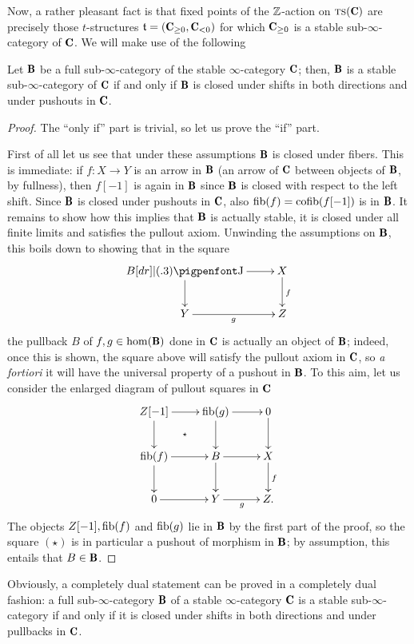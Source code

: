 \documentclass[a4paper,12pt]{amsart}
\begin{document}
Now, a rather pleasant fact is that fixed points of the $\mathbb{Z}$-action on $\ts(\C)$ are precisely those $t$-structures $\tee=(\C_{\ge 0}, \C_{<0})$ for which $\C_{\ge 0}$ is a stable sub-$\infty$-category of $\C$. We will make use of the following
\begin{lemma}\label{magicstable}
Let $\cate{B}$ be a full sub-$\infty$-category of the stable $\infty$-category $\C$; then, $\cate{B}$ is a stable sub-$\infty$-category of $\C$ if and only if $\cate{B}$ is closed under shifts in both directions and under pushouts in $\C$.
\end{lemma}
\begin{proof}
The ``only if'' part is trivial, so let us prove the ``if'' part.

First of all let us see that under these assumptions $\cate{B}$ is closed under fibers. This is immediate: if $f\colon X\to Y$ is an arrow in $\cate{B}$ (\ie an arrow of $\C$ between objects of $\cate{B}$, by fullness), then $f[-1]$ is again in $\cate{B}$ since $\cate{B}$ is closed with respect to the left shift. Since $\cate{B}$ is closed under pushouts in $\C$, also  $\operatorname{fib}(f)=\operatorname{cofib}(f[-1])$ is in $\cate{B}$. It remains to show how this implies that $\cate{B}$ is actually stable, \ie it is closed under all finite limits and satisfies the pullout axiom. Unwinding the assumptions on $\cate{B}$, this boils down to showing that in the square
\[
\xymatrix{
B \ar[r]\ar[d] \pb &  X\ar[d]^f \\
Y \ar[r]_g& Z
}
\]
the pullback $B$ of $f,g \in \hom(\cate{B})$ done in $\C$ is actually an object of $\cate{B}$; indeed, once this is shown, the square above will satisfy the pullout axiom in $\C$, 
so \emph{a fortiori} it will have the universal property of a pushout in $\cate{B}$. To this aim, let us consider the enlarged diagram of pullout squares in $\C$
\[
\xymatrix{
Z[-1]\ar[r]\ar[d] \ar@{}[dr]|\star & \fib(g)\ar[r]\ar[d] & 0\ar[d] \\
\fib(f)\ar[r]\ar[d] & B\ar[r]\ar[d] & X \ar[d]^f\\
0\ar[r] & Y \ar[r]_g & Z.
}
\]
The objects $Z[-1], \operatorname{fib}(f)$ and $\operatorname{fib}(g)$ lie in $\cate{B}$ by the first part of the proof, so the square $(\star)$ is in particular a pushout of morphism in $\cate{B}$; by assumption, this entails that $B\in\cate{B}$.
\end{proof}
\begin{remark}\label{oss.shifts.pullback}
Obviously, a completely dual statement can be proved in a completely dual fashion:  a full sub-$\infty$-category $\cate{B}$ of a stable $\infty$-category $\C$ is a stable sub-$\infty$-category if and only if it is closed under shifts in both directions and under pullbacks in $\C$.
\end{remark}
\end{document}
